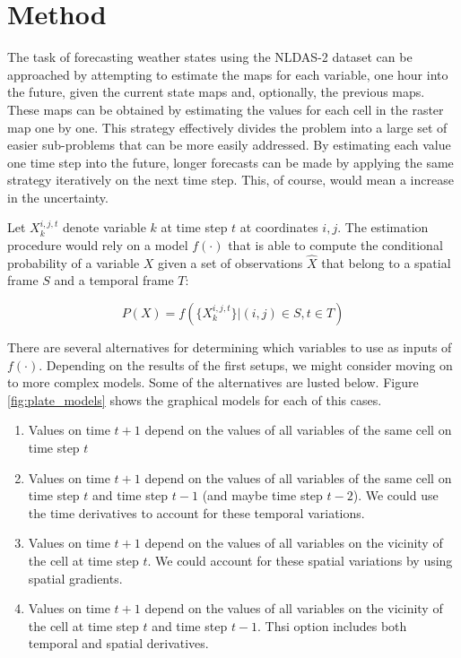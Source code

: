 \documentclass{article}
\begin{document}
\section{Method}

The task of forecasting weather states using the NLDAS-2 dataset can be
approached by attempting to estimate the maps for each variable, one hour into
the future, given the current state maps and, optionally, the previous maps.
These maps can be obtained by estimating the values for each cell in the raster
map one by one. This strategy effectively divides the problem into a large set
of easier sub-problems that can be more easily addressed. By estimating each
value one time step into the future, longer forecasts can be made by applying
the same strategy iteratively on the next time step. This, of course, would mean
a increase in the uncertainty.

Let $X_k^{i,j,t}$ denote variable $k$ at time step $t$ at coordinates $i, j$.
The estimation procedure would rely on a model $f(\cdot)$ that is able to
compute the conditional probability of a variable $X$ given a set of observations
$\hat{X}$ that belong to a spatial frame $S$ and a temporal frame $T$:

\begin{equation}
\label{eq:condProb}
P(X) = f(\{X_k^{i,j,t}\} | (i,j) \in S, t \in T)
\end{equation}

There are several alternatives for determining which variables to use as inputs
of $f(\cdot)$. Depending on the results of the first setups, we might consider
moving on to more complex models. Some of the alternatives are lusted below.
Figure \ref{fig:plate_models} shows the graphical models for each of this cases.

\begin{enumerate}
\item Values on time $t + 1$ depend on the values of all variables of the same
cell on time step $t$
\item Values on time $t + 1$ depend on the values of all variables of the same
cell on time step $t$ and time step $t - 1$ (and maybe time step $t- 2$). We
could use the time derivatives to account for these temporal variations.
\item Values on time $t + 1$ depend on the values of all variables on the
vicinity of the cell at time step $t$. We could account for these spatial
variations by using spatial gradients.
\item Values on time $t + 1$ depend on the values of all variables on the
vicinity of the cell at time step $t$ and time step $t -1$. Thsi option includes
both temporal and spatial derivatives.
\end{enumerate}
\end{document}
